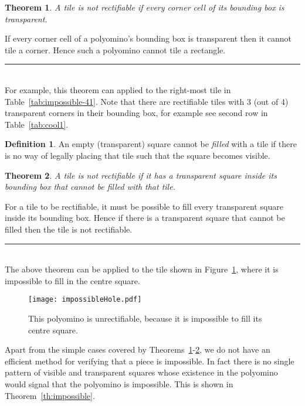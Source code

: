 \documentclass[10pt,a4paper]{article}
\newcommand{\BlackBox}{\rule{1.5ex}{1.5ex}}  \fi
\newenvironment{proof}{\par\noindent{\bf Proof\ }}{\hfill\BlackBox\\[2mm]}
\newtheorem{theorem}{Theorem}
\theoremstyle{definition}
\newtheorem{defn}{Definition}[section]
\begin{document}
\begin{theorem}
A tile is not rectifiable if every corner cell of its bounding box is transparent.
\label{th:impossible2}
\end{theorem}
\begin{proof}
If every corner cell of a polyomino's bounding box is transparent then 
it cannot tile a corner. Hence such a polyomino cannot tile a rectangle.
\end{proof}
For example, this theorem can applied to the right-most tile in Table~\ref{tab:impossible-41}.
Note that there are rectifiable tiles with 3 (out of 4) transparent corners in their bounding box,
for example see second row in Table~\ref{tab:cool1}.

\begin{defn}
An empty (transparent) square cannot be \emph{filled} with a tile if there is no way of legally placing that tile such that
the square becomes visible.
\end{defn}
\begin{theorem}
A tile is not rectifiable if it has a transparent square inside its bounding box that cannot be filled with that tile.
\label{th:impossibleHole}
\end{theorem}
\begin{proof}
For a tile to be rectifiable, it must be possible to fill every transparent square inside its bounding box.
Hence if there is a transparent square that cannot be filled then the tile is not rectifiable.
\end{proof}
The above theorem can be applied to the tile shown in Figure~\ref{fig:impossibleHole}, where it is impossible to fill in the centre square.

\begin{figure}[!htpb]
\centering
\texttt{[image: impossibleHole.pdf]}
\caption{This polyomino is unrectifiable, because it is impossible to fill its centre square.}
\label{fig:impossibleHole}
\end{figure}


Apart from the simple cases covered by Theorems~\ref{th:impossible2}-\ref{th:impossibleHole},
we do not have an efficient method for verifying that a piece is impossible.
In fact
there is no single pattern of visible and transparent squares whose existence in the polyomino would
signal that the polyomino is impossible. This is shown in Theorem~\ref{th:impossible}.
\end{document}
